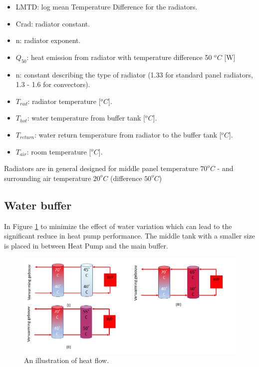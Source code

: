 \begin{itemize}
    \item LMTD: log mean Temperature Difference for the radiators.
    \item Crad: radiator constant.
    \item n: radiator exponent.
    \item $Q_{50}$: heat emission from radiator with temperature difference 50 $^oC$ [W]
    \item n: constant describing the type of radiator (1.33 for standard panel radiators, 1.3 - 1.6 for convectors). 
    \item $T_{rad}$: radiator temperature [$^oC$].
    \item $T_{hot}$: water temperature from buffer tank [$^oC$]. 
    \item $T_{return}$: water return temperature from radiator to the buffer tank [$^oC$].
    \item $T_{air}$: room temperature [$^oC$]. 
\end{itemize}
 Radiators are in general designed for middle panel temperature $70^oC$ - and surrounding air temperature $20^oC$ (difference $50^oC$)

\subsection{Water buffer}

In Figure \ref{fig:heatflow} to minimize the effect of water variation which can lead to the significant reduce in heat pump performance. The middle tank with a smaller size is placed in between Heat Pump and the main buffer.  

\begin{figure}[H]
\centering
\includegraphics[width=1\columnwidth]{pictures/middle_tank.png}
\caption[Short title]{An illustration of heat flow.}
\label{fig:heatflow}
\end{figure}

